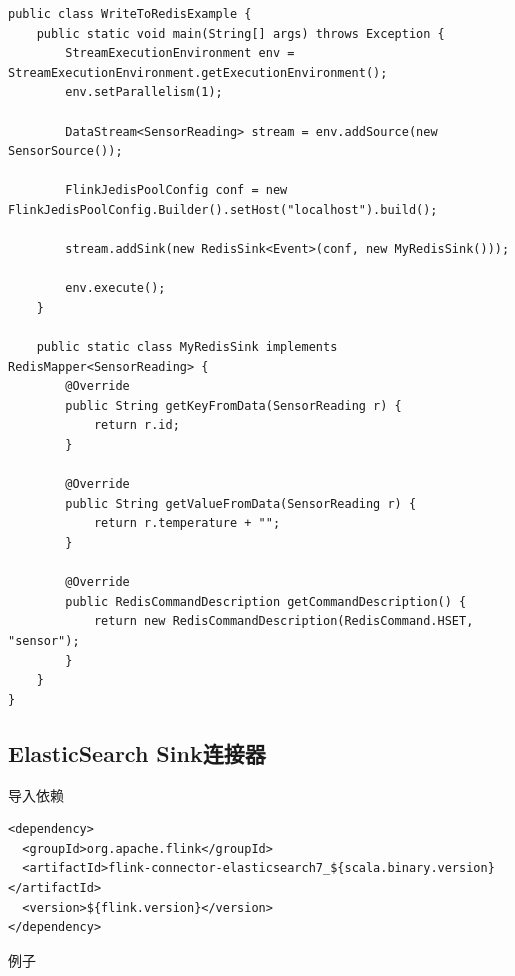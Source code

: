 \documentclass[cn,11pt,chinese]{elegantbook}
\begin{document}
\begin{verbatim}
public class WriteToRedisExample {
    public static void main(String[] args) throws Exception {
        StreamExecutionEnvironment env = StreamExecutionEnvironment.getExecutionEnvironment();
        env.setParallelism(1);

        DataStream<SensorReading> stream = env.addSource(new SensorSource());

        FlinkJedisPoolConfig conf = new FlinkJedisPoolConfig.Builder().setHost("localhost").build();

        stream.addSink(new RedisSink<Event>(conf, new MyRedisSink()));

        env.execute();
    }

    public static class MyRedisSink implements RedisMapper<SensorReading> {
        @Override
        public String getKeyFromData(SensorReading r) {
            return r.id;
        }

        @Override
        public String getValueFromData(SensorReading r) {
            return r.temperature + "";
        }

        @Override
        public RedisCommandDescription getCommandDescription() {
            return new RedisCommandDescription(RedisCommand.HSET, "sensor");
        }
    }
}
\end{verbatim}

\subsection{ElasticSearch Sink连接器}

导入依赖

\begin{verbatim}
<dependency>
  <groupId>org.apache.flink</groupId>
  <artifactId>flink-connector-elasticsearch7_${scala.binary.version}</artifactId>
  <version>${flink.version}</version>
</dependency>
\end{verbatim}

例子
\end{document}
